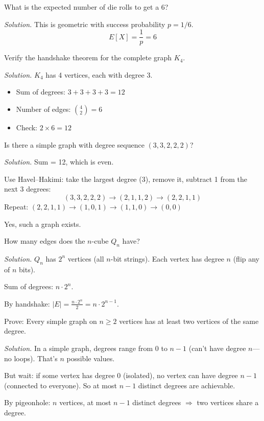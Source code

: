 \begin{example}
What is the expected number of die rolls to get a 6?

\emph{Solution.} This is geometric with success probability $p = 1/6$.
\[
E[X] = \frac{1}{p} = 6
\]
\end{example}

\begin{example}
Verify the handshake theorem for the complete graph $K_4$.

\emph{Solution.} $K_4$ has 4 vertices, each with degree 3.
\begin{itemize}
  \item Sum of degrees: $3 + 3 + 3 + 3 = 12$
  \item Number of edges: $\binom{4}{2} = 6$
  \item Check: $2 \times 6 = 12$ \checkmark
\end{itemize}
\end{example}

\begin{example}
Is there a simple graph with degree sequence $(3, 3, 2, 2, 2)$?

\emph{Solution.} Sum = 12, which is even. \checkmark

Use Havel--Hakimi: take the largest degree (3), remove it, subtract 1 from the next 3 degrees:
\[
(3, 3, 2, 2, 2) \to (2, 1, 1, 2) \to (2, 2, 1, 1)
\]
Repeat: $(2, 2, 1, 1) \to (1, 0, 1) \to (1, 1, 0) \to (0, 0)$ \checkmark

Yes, such a graph exists.
\end{example}

\begin{example}[Edges in $Q_n$]
How many edges does the $n$-cube $Q_n$ have?

\emph{Solution.} $Q_n$ has $2^n$ vertices (all $n$-bit strings). Each vertex has degree $n$ (flip any of $n$ bits).

Sum of degrees: $n \cdot 2^n$.

By handshake: $|E| = \frac{n \cdot 2^n}{2} = n \cdot 2^{n-1}$.
\end{example}

\begin{example}
Prove: Every simple graph on $n \geq 2$ vertices has at least two vertices of the same degree.

\emph{Solution.} In a simple graph, degrees range from 0 to $n-1$ (can't have degree $n$---no loops). That's $n$ possible values.

But wait: if some vertex has degree 0 (isolated), no vertex can have degree $n-1$ (connected to everyone). So at most $n-1$ distinct degrees are achievable.

By pigeonhole: $n$ vertices, at most $n-1$ distinct degrees $\Rightarrow$ two vertices share a degree.
\end{example}

